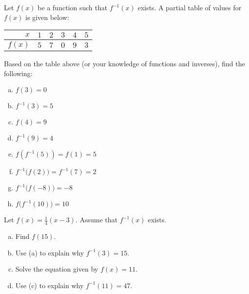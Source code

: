 \documentclass[11pt,letterpaper]{article}
\begin{document}

 Let $f(x)$ be a function such that $f^{-1}(x)$ exists. A partial table of values for $f(x)$ is given below: \par
	\begin{table}[!ht]
	\centering
	\begin{tabular}{|r||c|c|c|c|c|} \hline 
	$x$ & $1$ & $2$ & $3$ & $4$ & $5$ \\ \hline
	$f(x)$ & $5$ & $7$ & $0$ & $9$ & $3$ \\ \hline
	\end{tabular}
	\end{table}
Based on the table above (or your knowledge of functions and inverses), find the following:
	\begin{enumerate}[(a)]
	\item $f(3)= 0$
	\item $f^{-1}(3)= 5$
	\item $f(4)= 9$
	\item $f^{-1}(9)= 4$
	\item $f(f^{-1}(5))= f(1)= 5$
	\item $f^{-1} \big( f(2) \big)= f^{-1}(7)= 2$
	\item $f^{-1} \big( f(-8) \big)= -8$
	\item $f \big( f^{-1}(10) \big)= 10$
	\end{enumerate}



\newpage



 Let $f(x)= \frac{1}{4} (x - 3)$. Assume that $f^{-1}(x)$ exists. 
	\begin{enumerate}[(a)]
	\item Find $f(15)$. 
	\item Use (a) to explain why $f^{-1}(3)= 15$. 
	\item Solve the equation given by $f(x)= 11$.
	\item Use (c) to explain why $f^{-1}(11)= 47$. 
	\end{enumerate} \pspace
\end{document}
